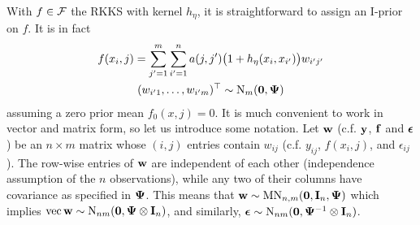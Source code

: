 With $f \in {\mathcal F}$ the RKKS with kernel $h_\eta$, it is straightforward to assign an I-prior on $f$. 
It is in fact
\begin{align}\label{eq:naiveclassiprior}
  \begin{gathered}
    f(x_i,j) = \sum_{j'=1}^m\sum_{i'=1}^n a(j,j')\big(1 + h_\eta(x_i,x_{i'})\big) w_{i'j'} \\
    (w_{i'1},\dots,w_{i'm})^\top \sim \operatorname{N}_m({\mathbf 0},{\bm\Psi})
  \end{gathered}
\end{align}
assuming a zero prior mean $f_0(x,j) = 0$.
It is much convenient to work in vector and matrix form, so let us introduce some notation.
Let ${\mathbf w}$ (c.f. ${\mathbf y}$, ${\mathbf f}$ and ${\bm\epsilon}$) be an $n \times m$ matrix whose $(i,j)$  entries contain $w_{ij}$ (c.f. $y_{ij}$, $f(x_i,j)$, and $\epsilon_{ij}$).
The row-wise entries of ${\mathbf w}$ are independent of each other (independence assumption of the $n$ observations), while any two of their columns have covariance as specified in ${\bm\Psi}$.
This means that ${\mathbf w} \sim \operatorname{MN}_{n,m}({\mathbf 0}, {\mathbf I}_n,{\bm\Psi})$ which implies $\operatorname{vec} {\mathbf w} \sim \operatorname{N}_{nm}({\mathbf 0}, {\bm\Psi} \otimes {\mathbf I}_n)$, and similarly, ${\bm\epsilon} \sim \operatorname{N}_{nm}({\mathbf 0}, {\bm\Psi}^{-1} \otimes {\mathbf I}_n)$.
